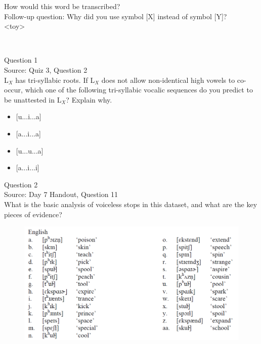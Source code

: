 \documentclass[12pt]{article}
\begin{document}
How would this word be transcribed?\\ Follow-up question: Why did you use symbol [X] instead of symbol [Y]?\\

<toy>


\newpage

\begin{center}
\textbf{{\color{red}{\HUGE END OF EXAM}}}\\

\end{center}
\newpage

\begin{center}
\textbf{{\color{blue}{\HUGE START OF EXAM\\}}}

\textbf{{\color{blue}{\HUGE Student ID: 3684\\}}}

\textbf{{\color{blue}{\HUGE 12:30 - 12:45 PM\\}}}

\end{center}
\newpage

{\large Question 1}\\

Source: Quiz 3, Question 2\\

L$_X$ has tri-syllabic roots. If L$_X$ does not allow non-identical high vowels to co-occur, which one of the following tri-syllabic vocalic sequences do you predict to be unattested in L$_X$? Explain why.\\

\begin{itemize} \item {[u...i...a]} \item {[a...i...a]} \item {[u...u...a]} \item {[a...i...i]} \end{itemize}


\newpage

{\large Question 2}\\

Source: Day 7 Handout, Question 11\\

What is the basic analysis of voiceless stops in this dataset, and what are the key pieces of evidence?\\

\begin{figure}[H]
\includegraphics{../images/english11.png}
\end{figure}
\end{document}
